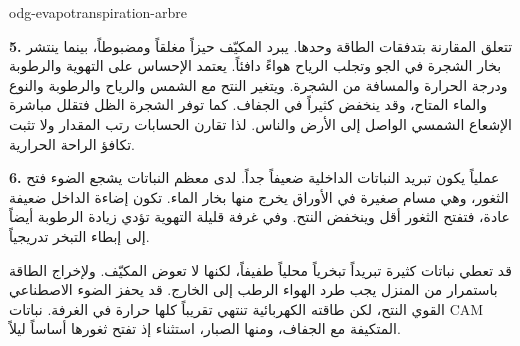 \begin{exo}{odg-evapotranspiration-arbre}
\begin{solution}
\textbf{5.} تتعلق المقارنة بتدفقات الطاقة وحدها. يبرد المكيّف حيزاً مغلقاً ومضبوطاً، بينما ينتشر بخار الشجرة في الجو وتجلب الرياح هواءً دافئاً. يعتمد الإحساس على التهوية والرطوبة ودرجة الحرارة والمسافة من الشجرة. ويتغير النتح مع الشمس والرياح والرطوبة والنوع والماء المتاح، وقد ينخفض كثيراً في الجفاف. كما توفر الشجرة الظل فتقلل مباشرة الإشعاع الشمسي الواصل إلى الأرض والناس. لذا تقارن الحسابات رتب المقدار ولا تثبت تكافؤ الراحة الحرارية.

\textbf{6.} عملياً يكون تبريد النباتات الداخلية ضعيفاً جداً. لدى معظم النباتات يشجع الضوء فتح الثغور، وهي مسام صغيرة في الأوراق يخرج منها بخار الماء. تكون إضاءة الداخل ضعيفة عادة، فتفتح الثغور أقل وينخفض النتح. وفي غرفة قليلة التهوية تؤدي زيادة الرطوبة أيضاً إلى إبطاء التبخر تدريجياً.

قد تعطي نباتات كثيرة تبريداً تبخرياً محلياً طفيفاً، لكنها لا تعوض المكيّف. ولإخراج الطاقة باستمرار من المنزل يجب طرد الهواء الرطب إلى الخارج. قد يحفز الضوء الاصطناعي القوي النتح، لكن طاقته الكهربائية تنتهي تقريباً كلها حرارة في الغرفة. نباتات CAM المتكيفة مع الجفاف، ومنها الصبار، استثناء إذ تفتح ثغورها أساساً ليلاً.
\end{solution}
\end{exo}

